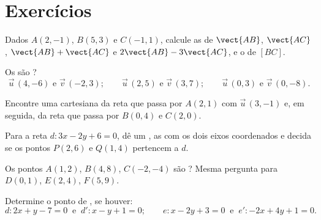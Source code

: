 \section{Exercícios}

\begin{exercise}[$\star$]\label{exo:g11:vect:1}
Dados $A(2, -1)$, $B(5, 3)$ e $C(-1, 1)$, calcule as  de
$\vect{AB}$, $\vect{AC}$, $\vect{AB} + \vect{AC}$ e
$2\vect{AB} - 3\vect{AC}$, e o  de $[BC]$.
\end{exercise}

\begin{exercise}[$\star$]\label{exo:g11:vect:2}
Os  são ?
\[
\vec u\,(4, -6) \text{ e } \vec v\,(-2, 3); \qquad
\vec u\,(2, 5) \text{ e } \vec v\,(3, 7); \qquad
\vec u\,(0, 3) \text{ e } \vec v\,(0, -8).
\]
\end{exercise}

\begin{exercise}[$\star$]\label{exo:g11:vect:3}
Encontre uma  cartesiana da reta que passa por $A(2, 1)$ com  $\vec u\,(3, -1)$ e, em seguida, da reta que passa por $B(0, 4)$
e $C(2, 0)$.
\end{exercise}

\begin{exercise}[$\star$]\label{exo:g11:vect:4}
Para a reta $d: 3x - 2y + 6 = 0$, dê um , as  com
os dois eixos coordenados e decida se os pontos $P(2, 6)$ e $Q(1, 4)$
pertencem a $d$.
\end{exercise}

\begin{exercise}[$\star\star$]\label{exo:g11:vect:5}
Os pontos $A(1, 2)$, $B(4, 8)$, $C(-2, -4)$ são ? Mesma
pergunta para $D(0, 1)$, $E(2, 4)$, $F(5, 9)$.
\end{exercise}

\begin{exercise}[$\star\star$]\label{exo:g11:vect:6}
Determine o ponto de , se houver:
\[
d: 2x + y - 7 = 0 \ \text{ e }\ d': x - y + 1 = 0;
\qquad
e: x - 2y + 3 = 0 \ \text{ e }\ e': -2x + 4y + 1 = 0 .
\]
\end{exercise}

